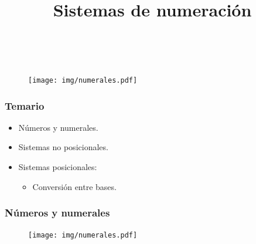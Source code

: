 \documentclass[11pt,a4paper,spanish]{beamer}
\title{Sistemas de numeración}
\author{}
\date{}
\begin{document}
\begin{frame}[noframenumbering]

    \maketitle
    \centering
    \vspace{-8em}~
    \begin{figure}
    \texttt{[image: img/numerales.pdf]}
        \captionsetup{textfont=tiny,labelformat=empty,justification=centering}
        \caption{}
    \end{figure}

\end{frame}

\begin{frame}

    \frametitle{Temario}

\begin{itemize}

    \item Números y numerales.

    \item Sistemas no posicionales.

    \item Sistemas posicionales:
    \begin{itemize}
        \item Conversión entre bases.
    \end{itemize}

\end{itemize}
\end{frame}

\begin{frame}

\frametitle{Números y numerales}

\begin{figure}
    \centering
    \texttt{[image: img/numerales.pdf]}
    \captionsetup{textfont=tiny,labelformat=empty}
    \caption{}
\end{figure}

\end{frame}
\end{document}
